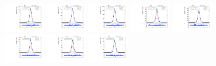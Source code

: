 \begin{figure}[htb]
\includegraphics[width=0.19\textwidth]{plots/Appendix_Recoil_Fits/ZmmData_PF_13TeV_2G_bkg/pfu2fit_16.pdf}
\includegraphics[width=0.19\textwidth]{plots/Appendix_Recoil_Fits/ZmmData_PF_13TeV_2G_bkg/pfu2fit_17.pdf}
\includegraphics[width=0.19\textwidth]{plots/Appendix_Recoil_Fits/ZmmData_PF_13TeV_2G_bkg/pfu2fit_18.pdf}
\includegraphics[width=0.19\textwidth]{plots/Appendix_Recoil_Fits/ZmmData_PF_13TeV_2G_bkg/pfu2fit_19.pdf}
\includegraphics[width=0.19\textwidth]{plots/Appendix_Recoil_Fits/ZmmData_PF_13TeV_2G_bkg/pfu2fit_20.pdf}
\includegraphics[width=0.19\textwidth]{plots/Appendix_Recoil_Fits/ZmmData_PF_13TeV_2G_bkg/pfu2fit_21.pdf}
\includegraphics[width=0.19\textwidth]{plots/Appendix_Recoil_Fits/ZmmData_PF_13TeV_2G_bkg/pfu2fit_22.pdf}
\includegraphics[width=0.19\textwidth]{plots/Appendix_Recoil_Fits/ZmmData_PF_13TeV_2G_bkg/pfu2fit_23.pdf}

\end{figure}
